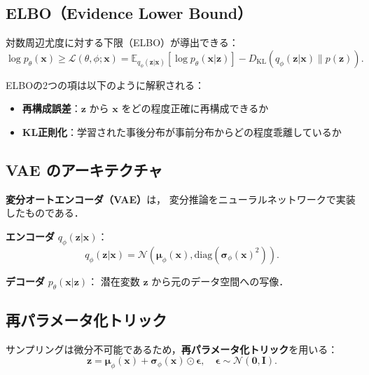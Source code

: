 \subsection{ELBO（Evidence Lower Bound）}

対数周辺尤度に対する下限（ELBO）が導出できる：
\begin{equation}
  \log p_\theta(\boldsymbol{x}) \geq \mathcal{L}(\theta, \phi; \boldsymbol{x}) = \mathbb{E}_{q_\phi(\boldsymbol{z}|\boldsymbol{x})}\left[\log p_\theta(\boldsymbol{x}|\boldsymbol{z})\right] - D_{\mathrm{KL}}(q_\phi(\boldsymbol{z}|\boldsymbol{x}) \| p(\boldsymbol{z})).
  \label{eq:elbo}
\end{equation}

ELBOの2つの項は以下のように解釈される：
\begin{itemize}
  \item \textbf{再構成誤差}：$\boldsymbol{z}$ から $\boldsymbol{x}$ をどの程度正確に再構成できるか
  \item \textbf{KL正則化}：学習された事後分布が事前分布からどの程度乖離しているか
\end{itemize}

\subsection{VAE のアーキテクチャ}

\textbf{変分オートエンコーダ（VAE）}\cite{Kingma2014}は，
変分推論をニューラルネットワークで実装したものである．

\textbf{エンコーダ} $q_\phi(\boldsymbol{z}|\boldsymbol{x})$：
\begin{equation}
  q_\phi(\boldsymbol{z}|\boldsymbol{x}) = \mathcal{N}(\boldsymbol{\mu}_\phi(\boldsymbol{x}), \mathrm{diag}(\boldsymbol{\sigma}_\phi(\boldsymbol{x})^2)).
\end{equation}

\textbf{デコーダ} $p_\theta(\boldsymbol{x}|\boldsymbol{z})$：
潜在変数 $\boldsymbol{z}$ から元のデータ空間への写像．

\subsection{再パラメータ化トリック}

サンプリングは微分不可能であるため，\textbf{再パラメータ化トリック}を用いる：
\begin{equation}
  \boldsymbol{z} = \boldsymbol{\mu}_\phi(\boldsymbol{x}) + \boldsymbol{\sigma}_\phi(\boldsymbol{x}) \odot \boldsymbol{\epsilon}, \quad \boldsymbol{\epsilon} \sim \mathcal{N}(\mathbf{0}, \mathbf{I}).
  \label{eq:reparameterization}
\end{equation}

